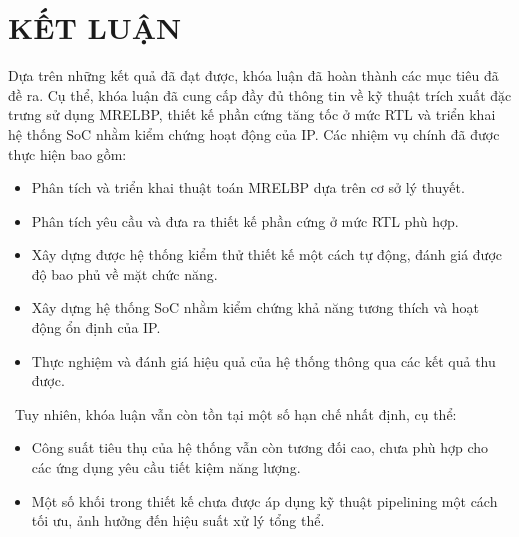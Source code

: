 \documentclass[a4paper,12pt,oneside]{book}%
\begin{document}
\clearpage
{}
{}
\renewcommand{\listfigurename}{\vspace{-70pt}\centerline{\fontsize{14}{16}\selectfont{\MakeUppercase{Danh mục   hình vẽ}}}}
\listoffigures
\fontsize{13}{16}\selectfont
\newpage
\clearpage
{}
{}
\renewcommand{\listtablename}{\vspace{-70pt}\centerline{\fontsize{14}{16}\selectfont{\MakeUppercase{Danh mục bảng biểu}}}}
\listoftables
\fontsize{13}{16}\selectfont
\newpage

\pagestyle{plain}


\newpage

\newpage

\newpage

\newpage

\newpage

\newpage
{}
\chapter*{KẾT LUẬN}
Dựa trên những kết quả đã đạt được, khóa luận đã hoàn thành các mục tiêu đã đề ra. Cụ thể, khóa luận đã cung cấp đầy đủ thông tin về kỹ thuật trích xuất đặc trưng sử dụng MRELBP, thiết kế phần cứng tăng tốc ở mức RTL và triển khai hệ thống SoC nhằm kiểm chứng hoạt động của IP. Các nhiệm vụ chính đã được thực hiện bao gồm:
\begin{itemize}
	\item Phân tích và triển khai thuật toán MRELBP dựa trên cơ sở lý thuyết.
	\item Phân tích yêu cầu và đưa ra thiết kế phần cứng ở mức RTL phù hợp.
	\item Xây dựng được hệ thống kiểm thử thiết kế một cách tự động, đánh giá được độ bao phủ về mặt chức năng.
	\item Xây dựng hệ thống SoC nhằm kiểm chứng khả năng tương thích và hoạt động ổn định của IP.
	\item Thực nghiệm và đánh giá hiệu quả của hệ thống thông qua các kết quả thu được.
\end{itemize}
\noindent\ Tuy nhiên, khóa luận vẫn còn tồn tại một số hạn chế nhất định, cụ thể:
\begin{itemize}
	\item Công suất tiêu thụ của hệ thống vẫn còn tương đối cao, chưa phù hợp cho các ứng dụng yêu cầu tiết kiệm năng lượng.
	\item Một số khối trong thiết kế chưa được áp dụng kỹ thuật pipelining một cách tối ưu, ảnh hưởng đến hiệu suất xử lý tổng thể.
\end{itemize}
\end{document}
